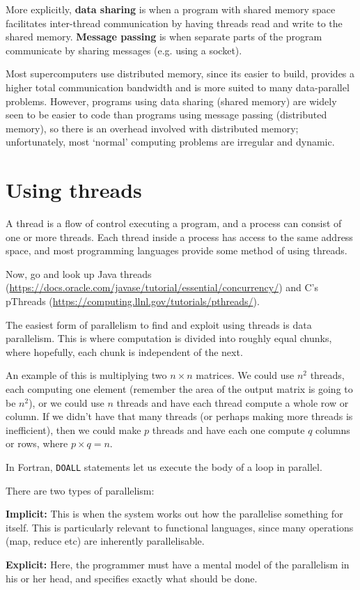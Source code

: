 More explicitly, \textbf{data sharing} is when a program with shared memory
space facilitates inter-thread communication by having threads read and write to
the shared memory. \textbf{Message passing} is when separate parts of the
program communicate by sharing messages (e.g. using a socket).

Most supercomputers use distributed memory, since its easier to build, provides
a higher total communication bandwidth and is more suited to many data-parallel
problems. However, programs using data sharing (shared memory) are widely seen
to be easier to code than programs using message passing (distributed memory),
so there is an overhead involved with distributed memory; unfortunately, most
`normal' computing problems are irregular and dynamic.


\section{Using threads}

A thread is a flow of control executing a program, and a process can consist of
one or more threads. Each thread inside a process has access to the same
address space, and most programming languages provide some method of using
threads.

Now, go and look up Java threads
(\url{https://docs.oracle.com/javase/tutorial/essential/concurrency/}) and C's
pThreads (\url{https://computing.llnl.gov/tutorials/pthreads/}).

The easiest form of parallelism to find and exploit using threads is data
parallelism. This is where computation is divided into roughly equal chunks,
where hopefully, each chunk is independent of the next.

An example of this is multiplying two $n\times n$ matrices. We could use $n^2$
threads, each computing one element (remember the area of the output matrix is
going to be $n^2$), or we could use $n$ threads and have each thread compute a
whole row or column. If we didn't have that many threads (or perhaps making more
threads is inefficient), then we could make $p$ threads and have each one
compute $q$ columns or rows, where $p\times q = n$.

In Fortran, \texttt{DOALL} statements let us execute the body of a loop in
parallel.

There are two types of parallelism:

\begin{description}
  \item \textbf{Implicit:} This is when the system works out how the parallelise
  something for itself. This is particularly relevant to functional languages,
  since many operations (map, reduce etc) are inherently parallelisable.
  \item \textbf{Explicit:} Here, the programmer must have a mental model of the
  parallelism in his or her head, and specifies exactly what should be done.
\end{description}

